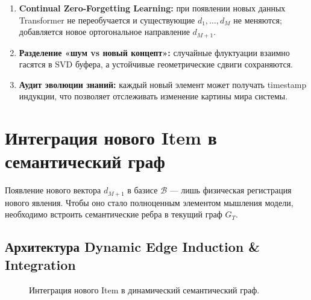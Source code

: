 \documentclass[11pt,a4paper]{article}
\begin{document}
\begin{enumerate}
    \item \textbf{Continual Zero-Forgetting Learning:} при появлении новых данных Transformer не переобучается и существующие $d_1,\dots,d_M$ не меняются; добавляется новое ортогональное направление $d_{M+1}$.
    \item \textbf{Разделение «шум vs новый концепт»:} случайные флуктуации взаимно гасятся в SVD буфера, а устойчивые геометрические сдвиги сохраняются.
    \item \textbf{Аудит эволюции знаний:} каждый новый элемент может получать timestamp индукции, что позволяет отслеживать изменение картины мира системы.
\end{enumerate}

\section{Интеграция нового Item в семантический граф}

Появление нового вектора $d_{M+1}$ в базисе $\mathcal{B}$ — лишь физическая регистрация нового явления. Чтобы оно стало полноценным элементом мышления модели, необходимо встроить семантические ребра в текущий граф $G_T$.

\subsection*{Архитектура Dynamic Edge Induction \& Integration}

\begin{figure}[H]
\centering
{}
\caption{Интеграция нового Item в динамический семантический граф.}
\end{figure}
\end{document}
